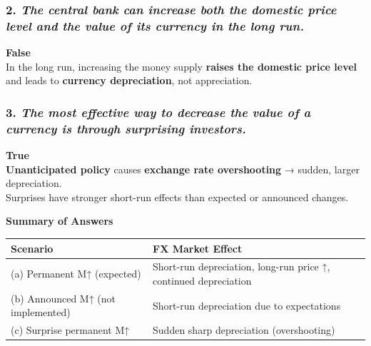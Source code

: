 \documentclass[
]{article}
\begin{document}
\subsubsection{\texorpdfstring{2. \emph{The central bank can increase
both the domestic price level and the value of its currency in the long
run.}}{2. The central bank can increase both the domestic price level and the value of its currency in the long run.}}\label{the-central-bank-can-increase-both-the-domestic-price-level-and-the-value-of-its-currency-in-the-long-run.}

\textbf{False}\\
In the long run, increasing the money supply \textbf{raises the domestic
price level} and leads to \textbf{currency depreciation}, not
appreciation.

\subsubsection{\texorpdfstring{3. \emph{The most effective way to
decrease the value of a currency is through surprising
investors.}}{3. The most effective way to decrease the value of a currency is through surprising investors.}}\label{the-most-effective-way-to-decrease-the-value-of-a-currency-is-through-surprising-investors.}

\textbf{True}\\
\textbf{Unanticipated policy} causes \textbf{exchange rate overshooting}
→ sudden, larger depreciation.\\
Surprises have stronger short-run effects than expected or announced
changes.

\textbf{Summary of Answers}

\begin{longtable}[]{@{}
  >{\raggedright\arraybackslash}p{}
  >{\raggedright\arraybackslash}p{}@{}}
\toprule\noalign{}
\begin{minipage}[b]{\linewidth}\raggedright
Scenario
\end{minipage} & \begin{minipage}[b]{\linewidth}\raggedright
FX Market Effect
\end{minipage} \\
\midrule\noalign{}
\endhead
\bottomrule\noalign{}
\endlastfoot
(a) Permanent M↑ (expected) & Short-run depreciation, long-run price ↑,
continued depreciation \\
(b) Announced M↑ (not implemented) & Short-run depreciation due to
expectations \\
(c) Surprise permanent M↑ & Sudden sharp depreciation (overshooting) \\
\end{longtable}
\end{document}
